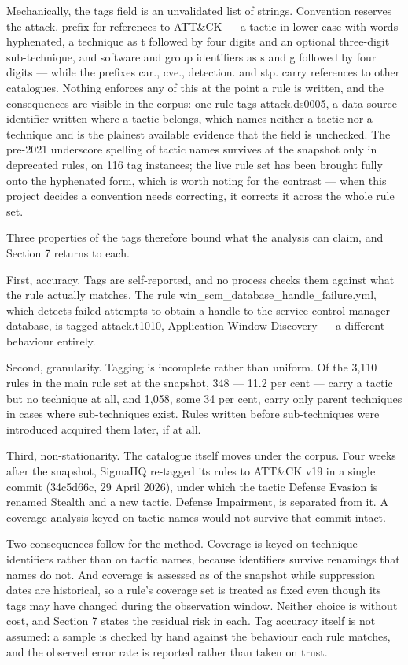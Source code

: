 Mechanically, the tags field is an unvalidated list of strings. Convention reserves the attack. prefix for references to ATT\&CK --- a tactic in lower case with words hyphenated, a technique as t followed by four digits and an optional three-digit sub-technique, and software and group identifiers as s and g followed by four digits --- while the prefixes car., cve., detection. and stp. carry references to other catalogues. Nothing enforces any of this at the point a rule is written, and the consequences are visible in the corpus: one rule tags attack.ds0005, a data-source identifier written where a tactic belongs, which names neither a tactic nor a technique and is the plainest available evidence that the field is unchecked. The pre-2021 underscore spelling of tactic names survives at the snapshot only in deprecated rules, on 116 tag instances; the live rule set has been brought fully onto the hyphenated form, which is worth noting for the contrast --- when this project decides a convention needs correcting, it corrects it across the whole rule set.

Three properties of the tags therefore bound what the analysis can claim, and Section 7 returns to each.

First, accuracy. Tags are self-reported, and no process checks them against what the rule actually matches. The rule win\_scm\_database\_handle\_failure.yml, which detects failed attempts to obtain a handle to the service control manager database, is tagged attack.t1010, Application Window Discovery --- a different behaviour entirely.

Second, granularity. Tagging is incomplete rather than uniform. Of the 3,110 rules in the main rule set at the snapshot, 348 --- 11.2 per cent --- carry a tactic but no technique at all, and 1,058, some 34 per cent, carry only parent techniques in cases where sub-techniques exist. Rules written before sub-techniques were introduced acquired them later, if at all.

Third, non-stationarity. The catalogue itself moves under the corpus. Four weeks after the snapshot, SigmaHQ re-tagged its rules to ATT\&CK v19 in a single commit (34c5d66c, 29 April 2026), under which the tactic Defense Evasion is renamed Stealth and a new tactic, Defense Impairment, is separated from it. A coverage analysis keyed on tactic names would not survive that commit intact.

Two consequences follow for the method. Coverage is keyed on technique identifiers rather than on tactic names, because identifiers survive renamings that names do not. And coverage is assessed as of the snapshot while suppression dates are historical, so a rule's coverage set is treated as fixed even though its tags may have changed during the observation window. Neither choice is without cost, and Section 7 states the residual risk in each. Tag accuracy itself is not assumed: a sample is checked by hand against the behaviour each rule matches, and the observed error rate is reported rather than taken on trust.


